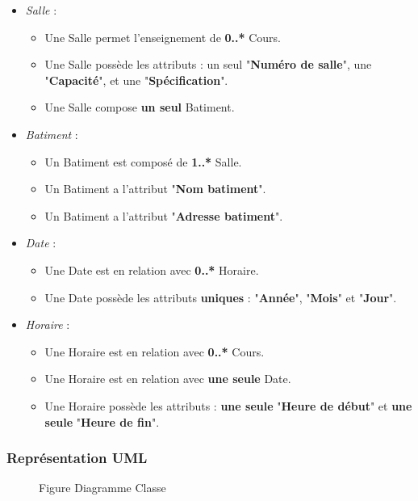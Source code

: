 \documentclass[a4paper, 11pt]{article}
\begin{document}
\begin{itemize}
\begin{itemize}
                \end{itemize}
        \item \textit{Salle} :
                \begin{itemize}
                \item Une Salle permet l'enseignement de \textbf{0..*} Cours.
                \item Une Salle possède les attributs : un seul "\textbf{Numéro de salle}", une "\textbf{Capacité}", et une "\textbf{Spécification}".
                \item Une Salle compose \textbf{un seul} Batiment.
                \end{itemize}
        \item \textit{Batiment} :
                \begin{itemize}
                \item Un Batiment est composé de \textbf{1..*} Salle.
                \item Un Batiment a l'attribut "\textbf{Nom batiment}".
                \item Un Batiment a l'attribut "\textbf{Adresse batiment}".
                \end{itemize}
        \item \textit{Date} :
                \begin{itemize}
                \item Une Date est en relation avec \textbf{0..*} Horaire.
                \item Une Date possède les attributs \textbf{uniques} : "\textbf{Année}", "\textbf{Mois}" et "\textbf{Jour}".
                \end{itemize}
        \item \textit{Horaire} :
                \begin{itemize}
                \item Une Horaire est en relation avec \textbf{0..*} Cours.
                \item Une Horaire est en relation avec \textbf{une seule} Date.
                \item Une Horaire possède les attributs : \textbf{une seule} "\textbf{Heure de début}" et \textbf{une seule} "\textbf{Heure de fin}".
                \end{itemize}
        \end{itemize}
	\subsubsection{ Représentation UML}
	\begin{figure}[h]
        \caption{Figure Diagramme Classe}
        \label{fig-diag-class-1}
        \end{figure}
	\clearpage
\end{document}

